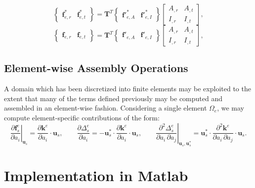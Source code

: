\documentclass[12pt,a4paper,article]{memoir} %
\begin{document}
\begin{equation}
  \left\{ \begin{array}{cc} \mathbf{f}^*_{e,r} & \mathbf{f}^*_{e,t} \end{array} \right\} = \mathbf{T}^T \left\{ \begin{array}{cc} \mathbf{f}'^*_{e,A} & \mathbf{f}'^*_{e,I} \end{array} \right\} \left[ \begin{array}{cc} A_{,r} & A_{,t} \\ I_{,r} & I_{,t} \end{array} \right],
\end{equation}
\begin{equation}
  \left\{ \begin{array}{cc} \mathbf{f}_{e,r} & \mathbf{f}_{e,t} \end{array} \right\} = \mathbf{T}^T \left\{ \begin{array}{cc} \mathbf{f}'_{e,A} & \mathbf{f}'_{e,I} \end{array} \right\} \left[ \begin{array}{cc} A_{,r} & A_{,t} \\ I_{,r} & I_{,t} \end{array} \right],
\end{equation}

\section{Element-wise Assembly Operations}

A domain which has been discretized into finite elements may be exploited to the extent that many of the terms defined previously may be computed and assembled in an element-wise fashion. Considering a single element $\Omega_e$, we may compute element-specific contributions of the form:
\begin{equation}
  \left. \frac{\partial \mathbf{f}^e_s}{\partial a_i} \right|_{\mathbf{u}_s} = \frac{\partial \mathbf{k}^e}{\partial a_i} \cdot \mathbf{u}_s, \qquad
  \frac{\partial \Delta^e_s}{\partial a_i} = - \mathbf{u}^*_s \cdot \frac{\partial \mathbf{k}^e}{\partial a_i} \cdot \mathbf{u}_s, \qquad
  \left. \frac{\partial^2 \Delta^e_s}{\partial a_i \, \partial a_j} \right|_{\mathbf{u}_s, \mathbf{u}^*_s} = \mathbf{u}^*_s \cdot \frac{\partial^2 \mathbf{k}^e}{\partial a_i \, \partial a_j} \cdot \mathbf{u}_s.
\end{equation}

\newpage

\chapter{Implementation in Matlab} \label{sec:implementation}
\end{document}

